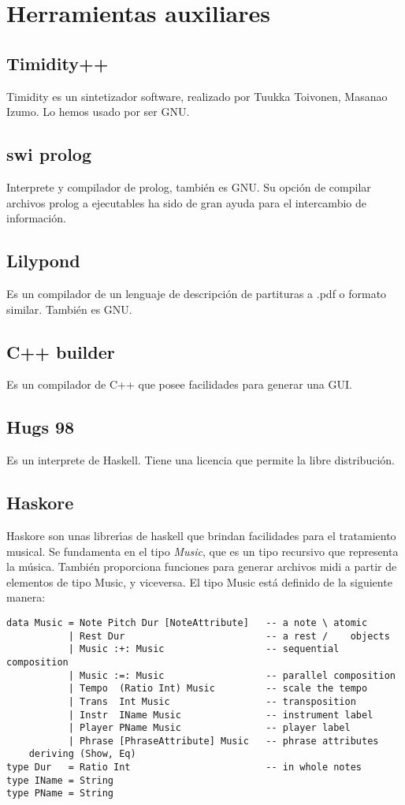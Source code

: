 \chapter{Herramientas auxiliares}
\section{Timidity++}
\label{timidity}
Timidity es un sintetizador software, realizado por Tuukka Toivonen, Masanao Izumo. Lo hemos usado por ser GNU.

\section{swi prolog}
Interprete y compilador de prolog, tambi\'en es GNU. Su opci\'on de compilar archivos prolog a ejecutables ha sido de gran ayuda para el intercambio de informaci\'on.

\section{Lilypond}
Es un compilador de un lenguaje de descripci\'on de partituras a .pdf o formato similar. Tambi\'en es GNU.

\section{C++ builder}
Es un compilador de C++ que posee facilidades para generar una GUI.

\section{Hugs 98}
Es un interprete de Haskell. Tiene una licencia que permite la libre distribuci\'on.

\section{Haskore}
Haskore son unas librer\'\i as de haskell que brindan facilidades para el tratamiento musical. Se fundamenta en el tipo \emph{Music}, que es un tipo recursivo que representa la m\'usica. Tambi\'en proporciona funciones para generar archivos midi a partir de elementos de tipo Music, y viceversa. El tipo Music est\'a definido de la siguiente manera:
\begin{verbatim}
data Music = Note Pitch Dur [NoteAttribute]   -- a note \ atomic 
           | Rest Dur                         -- a rest /    objects
           | Music :+: Music                  -- sequential composition
           | Music :=: Music                  -- parallel composition
           | Tempo  (Ratio Int) Music         -- scale the tempo
           | Trans  Int Music                 -- transposition
           | Instr  IName Music               -- instrument label
           | Player PName Music               -- player label
           | Phrase [PhraseAttribute] Music   -- phrase attributes
    deriving (Show, Eq)
type Dur   = Ratio Int                        -- in whole notes
type IName = String
type PName = String
\end{verbatim}

